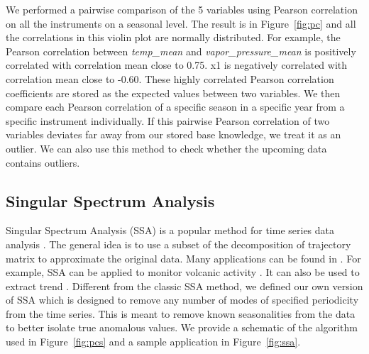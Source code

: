 \documentclass[letterpaper, 10 pt, conference]{ieeeconf}  %
\begin{document}
We performed a pairwise comparison of the 5 variables using Pearson correlation on all the instruments on a seasonal level. The result is in Figure~\ref{fig:pc} and all the correlations in this violin plot are normally distributed. For example, the Pearson correlation between \textit{temp\_mean} and \textit{vapor\_pressure\_mean} is positively correlated with correlation mean close to 0.75. x1 is negatively correlated with correlation mean close to -0.60. These highly correlated Pearson correlation coefficients are stored as the expected values between two variables. We then compare each Pearson correlation of a specific season in a specific year from a specific instrument individually. If this pairwise Pearson correlation of two variables deviates far away from our stored base knowledge, we treat it as an outlier. We can also use this method to check whether the upcoming data contains outliers.

\subsection{Singular Spectrum Analysis}
Singular Spectrum Analysis (SSA) is a popular method for time series data analysis \cite{golyandina2013singular, golyandina2014basic}. The general idea is to use a subset of the decomposition of trajectory matrix to approximate the original data. Many applications can be found in \cite{golyandina2013singular}. For example, SSA can be applied to monitor volcanic activity \cite{bozzo2010relationship}. It can also be used to extract trend \cite{alexandrov2008method}. Different from the classic SSA method, we defined our own version of SSA which is designed to remove any number of modes of specified periodicity from the time series. This is meant to remove known seasonalities from the data to better isolate true anomalous values. We provide a schematic of the algorithm used in Figure~\ref{fig:pcs} and a sample application in Figure~\ref{fig:ssa}.
\end{document}
